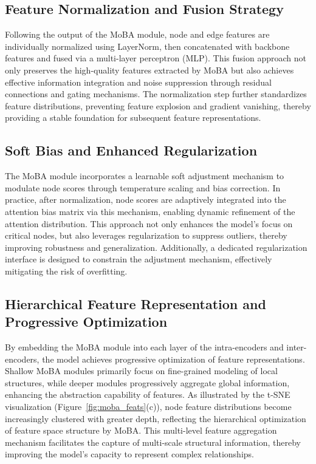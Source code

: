 \documentclass[11pt,a4paper]{article}
\begin{document}
\subsection{Feature Normalization and Fusion Strategy}
Following the output of the MoBA module, node and edge features are individually normalized using LayerNorm\cite{ba2016layer}, then concatenated with backbone features and fused via a multi-layer perceptron (MLP). This fusion approach not only preserves the high-quality features extracted by MoBA but also achieves effective information integration and noise suppression through residual connections\cite{he2016deep} and gating mechanisms\cite{graves2012long}. The normalization step further standardizes feature distributions, preventing feature explosion and gradient vanishing, thereby providing a stable foundation for subsequent feature representations.

\subsection{Soft Bias and Enhanced Regularization}
The MoBA module incorporates a learnable soft adjustment mechanism to modulate node scores through temperature scaling and bias correction. In practice, after normalization, node scores are adaptively integrated into the attention bias matrix via this mechanism, enabling dynamic refinement of the attention distribution. This approach not only enhances the model's focus on critical nodes, but also leverages regularization to suppress outliers, thereby improving robustness and generalization. Additionally, a dedicated regularization interface is designed to constrain the adjustment mechanism, effectively mitigating the risk of overfitting.

\subsection{Hierarchical Feature Representation and Progressive Optimization}
By embedding the MoBA module into each layer of the intra-encoders and inter-encoders, the model achieves progressive optimization of feature representations. Shallow MoBA modules primarily focus on fine-grained modeling of local structures, while deeper modules progressively aggregate global information, enhancing the abstraction capability of features. As illustrated by the t-SNE visualization (Figure~\ref{fig:moba_feats}(c)), node feature distributions become increasingly clustered with greater depth, reflecting the hierarchical optimization of feature space structure by MoBA. This multi-level feature aggregation mechanism facilitates the capture of multi-scale structural information, thereby improving the model's capacity to represent complex relationships.
\end{document}
